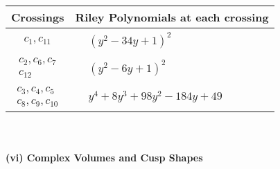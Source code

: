\documentclass[1p]{elsarticle_modified}
\theoremstyle{definition}
\begin{document}
\begin{tabular}{m{50pt}|m{274pt}}
Crossings & \hspace{64pt}Riley Polynomials at each crossing \\
\hline $$\begin{aligned}c_{1},c_{11}\end{aligned}$$&$\begin{aligned}
&(y^2-34 y+1)^2
\end{aligned}$\\
\hline $$\begin{aligned}c_{2},c_{6},c_{7}\\c_{12}\end{aligned}$$&$\begin{aligned}
&(y^2-6 y+1)^2
\end{aligned}$\\
\hline $$\begin{aligned}c_{3},c_{4},c_{5}\\c_{8},c_{9},c_{10}\end{aligned}$$&$\begin{aligned}
&y^4+8 y^3+98 y^2-184 y+49
\end{aligned}$\\
\hline
\end{tabular}\\~\\
\newpage\flushleft \textbf{(vi) Complex Volumes and Cusp Shapes}
\end{document}
